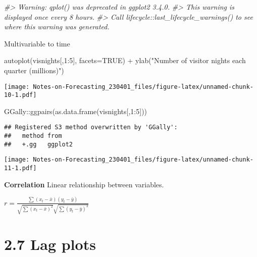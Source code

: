 \documentclass[
]{article}
\newenvironment{Shaded}{\begin{snugshade}}{\end{snugshade}}
\newcommand{\AttributeTok}[1]{\textcolor[rgb]{0.77,0.63,0.00}{#1}}
\newcommand{\CommentTok}[1]{\textcolor[rgb]{0.56,0.35,0.01}{\textit{#1}}}
\newcommand{\ConstantTok}[1]{\textcolor[rgb]{0.00,0.00,0.00}{#1}}
\newcommand{\DecValTok}[1]{\textcolor[rgb]{0.00,0.00,0.81}{#1}}
\newcommand{\FunctionTok}[1]{\textcolor[rgb]{0.00,0.00,0.00}{#1}}
\newcommand{\NormalTok}[1]{#1}
\newcommand{\SpecialCharTok}[1]{\textcolor[rgb]{0.00,0.00,0.00}{#1}}
\newcommand{\StringTok}[1]{\textcolor[rgb]{0.31,0.60,0.02}{#1}}
\begin{document}
\begin{Shaded}
\begin{Highlighting}[]
\CommentTok{\#\textgreater{} Warning: \textasciigrave{}qplot()\textasciigrave{} was deprecated in ggplot2 3.4.0.}
\CommentTok{\#\textgreater{} This warning is displayed once every 8 hours.}
\CommentTok{\#\textgreater{} Call \textasciigrave{}lifecycle::last\_lifecycle\_warnings()\textasciigrave{} to see where this warning was generated.}
\end{Highlighting}
\end{Shaded}

Multivariable to time

\begin{Shaded}
\begin{Highlighting}[]
\FunctionTok{autoplot}\NormalTok{(visnights[,}\DecValTok{1}\SpecialCharTok{:}\DecValTok{5}\NormalTok{], }\AttributeTok{facets=}\ConstantTok{TRUE}\NormalTok{) }\SpecialCharTok{+}
  \FunctionTok{ylab}\NormalTok{(}\StringTok{"Number of visitor nights each quarter (millions)"}\NormalTok{)}
\end{Highlighting}
\end{Shaded}

\texttt{[image: Notes-on-Forecasting\_230401\_files/figure-latex/unnamed-chunk-10-1.pdf]}

\begin{Shaded}
\begin{Highlighting}[]
\NormalTok{GGally}\SpecialCharTok{::}\FunctionTok{ggpairs}\NormalTok{(}\FunctionTok{as.data.frame}\NormalTok{(visnights[,}\DecValTok{1}\SpecialCharTok{:}\DecValTok{5}\NormalTok{]))}
\end{Highlighting}
\end{Shaded}

\begin{verbatim}
## Registered S3 method overwritten by 'GGally':
##   method from   
##   +.gg   ggplot2
\end{verbatim}

\texttt{[image: Notes-on-Forecasting\_230401\_files/figure-latex/unnamed-chunk-11-1.pdf]}

\textbf{Correlation} Linear relationship between variables.

\(r = \frac{\sum(x_t-\bar{x})(y_t-\bar{y})}{\sqrt{\sum(x_t-\bar{x})^2}{\sqrt{\sum(y_t-\bar{y})^2}}}\)

\hypertarget{lag-plots}{%
\section{2.7 Lag plots}\label{lag-plots}}
\end{document}
